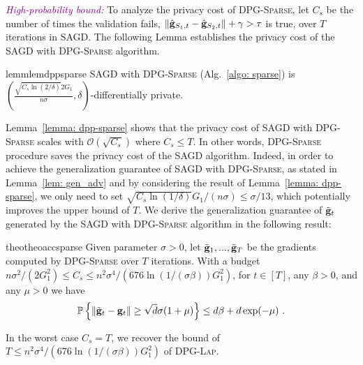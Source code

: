 \documentclass[11pt]{article}
\begin{document}
\textcolor{purple}{\textit{High-probability bound:}}
To analyze the privacy cost of \textsc{DPG-Sparse}, let $C_{s}$ be the number of times the validation fails, \ie $\| \hat {\mathbf{g}}_{S_1,t} - \hat {\mathbf{g}}_{S_2,t}\| + \gamma >  \tau$ is true, over $T$ iterations in \textsc{SAGD}. The following Lemma establishes the privacy cost of the \textsc{SAGD} with \textsc{DPG-Sparse} algorithm.
\begin{restatable}{lemm}{lemdppsparse}
\label{lemma: dpp-sparse}
\textsc{SAGD} with \textsc{DPG-Sparse}  (Alg.~\ref{algo: sparse}) is  
$(\frac{\sqrt{C_{s} \ln(2/\delta)} 2G_1}{n\sigma}, \delta)$-differentially private. 
\end{restatable}
Lemma~\ref{lemma: dpp-sparse} shows that the privacy cost of  \textsc{SAGD} with \textsc{DPG-Sparse} scales with $\mathcal{O}(\sqrt{C_{s}})$ where $C_{s} \leq T$. 
In other words, \textsc{DPG-Sparse} procedure saves the privacy cost of the \textsc{SAGD} algorithm. 
Indeed, in order to achieve the generalization guarantee of \textsc{SAGD} with \textsc{DPG-Sparse}, as stated in Lemma~\ref{lem: gen_adv} and  by considering the result of Lemma~\ref{lemma: dpp-sparse},  we only need to set $\sqrt{C_{s} \ln(1/\delta)} G_1/(n\sigma) \leq \sigma/13$, which potentially improves the upper bound of $T$. 
We derive the generalization guarantee of $\tilde {\mathbf{g}}_t$ generated by the \textsc{SAGD} with \textsc{DPG-Sparse} algorithm in the following result:
\begin{restatable}{theo}{theoaccsparse}
\label{thm: acc_sparse}
Given parameter $\sigma > 0$, let $\tilde {\mathbf{g}}_1,...,  \tilde {\mathbf{g}}_T$ be the gradients computed by \textsc{DPG-Sparse} over $T$ iterations. With a budget $ n\sigma^2/(2G_1^2) \leq C_{s} \leq n^2 \sigma^4/(676 \ln(1/(\sigma \beta))G_1^2)$, for $t \in [T]$, any $\beta > 0$, and any $\mu > 0$ we have 
        \begin{equation*}
    \mathbb{P}\left\{\|\tilde {\mathbf{g}}_t - \mathbf{g}_t\| \geq \sqrt{d}\sigma(1+\mu)\right\} \leq d\beta + d\exp(-\mu)~.
    \end{equation*}
\end{restatable}
In the worst case $C_{s} = T$, we recover the bound of $T \leq n^2 \sigma^4/(676 \ln(1/(\sigma \beta))G_1^2)$ of \textsc{DPG-Lap}.
\end{document}

